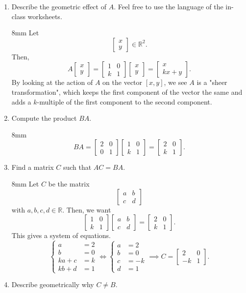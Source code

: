 \documentclass[letter]{article}
\newcommand{\R}{\mathbb{R}}
\newcommand{\mat}[1]{\begin{bmatrix}#1\end{bmatrix}}
\newenvironment{answer}{
	\begin{adjustwidth}{8mm}{} \vspace{2mm}}{\end{adjustwidth} \vspace{2mm}
}
\theoremstyle{plain}
\theoremstyle{definition}
\theoremstyle{remark}
\begin{document}
\begin{enumerate}
		\begin{enumerate}
			\item Describe the geometric effect of $A$.  Feel free to use the language of the in-class worksheets.
			\begin{answer}
				Let
				\[
				\mat{x\\y} \in \R^2.
				\]
				Then, 
				\[
				A\mat{x\\y} = \mat{1&0\\k&1}\mat{x\\y} = \mat{x\\kx+y}.
				\]
				By looking at the action of $A$ on the vector $[x,y]$, we see $A$ is a "sheer transformation", which keeps the first component of the vector the same and adds a $k$-multiple of the first component to the second component. 
			\end{answer}
			\item Compute the product $BA$.
			\begin{answer}
				\[
				BA = \mat{2&0\\0&1}\mat{1&0\\k&1} = \mat{2&0\\k&1}.
				\]
			\end{answer}
			\item Find a matrix $C$ such that $AC = BA$.
			\begin{answer}
				Let $C$ be the matrix
				\[
				\mat{a & b \\ c & d}
				\]
				with $a,b,c,d \in \R$. Then, we want
				\[
				\mat{1&0\\k&1}\mat{a&b\\c&d} = \mat{2 & 0 \\ k&1}.
				\]
				This gives a system of equations. 
				\[
				\begin{cases}
					a &= 2 \\
					b &= 0 \\
					ka + c &= k \\
					kb + d &= 1
				\end{cases} \iff
				\begin{cases}
					a &= 2 \\
					b &= 0 \\
					c &= -k \\
					d &= 1
				\end{cases} \implies C = \mat{2 & 0 \\ -k & 1}.
				\]
			\end{answer}
			\item Describe geometrically why $C \neq B$.

\end{enumerate}
\end{enumerate}
\end{document}
